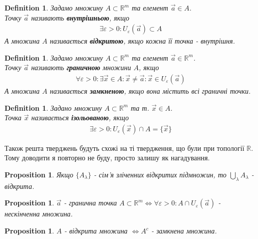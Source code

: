 \documentclass[a4paper, 10pt]{article}
\def\huge{\displaystyle}
\theoremstyle{theoremdd}
\theoremstyle{theoremdd}
\theoremstyle{theoremdd}
\newtheorem{definition}[theorem]{Definition}
\theoremstyle{theoremdd}
\theoremstyle{theoremdd}
\theoremstyle{theoremdd}
\newtheorem{proposition}[theorem]{Proposition}
\theoremstyle{theoremdd}
\theoremstyle{theoremdd}
\theoremstyle{theoremdd}
\begin{document}
\begin{definition}
Задамо множину $A \subset \mathbb{R}^m$ та елемент $\vec{a} \in A$.\\
Точку $\vec{a}$ називають \textbf{внутрішньою}, якщо
\begin{align*}
\exists \varepsilon > 0: U_\varepsilon (\vec{a}) \subset A
\end{align*}
А множина $A$ називається \textbf{відкритою}, якщо кожна її точка - внутрішня.
\end{definition}

\begin{definition}
Задамо множину $A \subset \mathbb{R}^m$ та елемент $\vec{a} \in \mathbb{R}^m$.\\
Точку $\vec{a}$ називають \textbf{граничною} множини $A$, якщо
\begin{align*}
\forall \varepsilon > 0: \exists \vec{x} \in A: \vec{x} \neq \vec{a}: \vec{x} \in U_{\varepsilon}(\vec{a})
\end{align*}
А множина $A$ називається \textbf{замкненою}, якщо вона містить всі граничні точки.
\end{definition}

\begin{definition}
Задано множину $A \subset \mathbb{R}^m$ та т. $\vec{x} \in A$.\\
Точка $\vec{x}$ називається \textbf{ізольованою}, якщо
\begin{align*}
\exists \varepsilon > 0: U_\varepsilon(\vec{x}) \cap A = \{\vec{x}\}
\end{align*}
\end{definition}

Також решта тверджень будуть схожі на ті твердження, що були при топології $\mathbb{R}$. Тому доводити я повторно не буду, просто залишу як нагадування.
\begin{proposition}
Якщо $\{A_\lambda\}$ - сім'я зліченних відкритих підмножин, то $\huge\bigcup_\lambda A_\lambda$ - відкрита.
\end{proposition}

\begin{proposition}
$\vec{a}$ - гранична точка $A \subset \mathbb{R}^m \iff \forall \varepsilon > 0: A \cap U_\varepsilon (\vec{a})$ - нескінченна множина.
\end{proposition}

\begin{proposition}
$A$ - відкрита множина $\iff A^c$ - замкнена множина.
\end{proposition}
\end{document}
